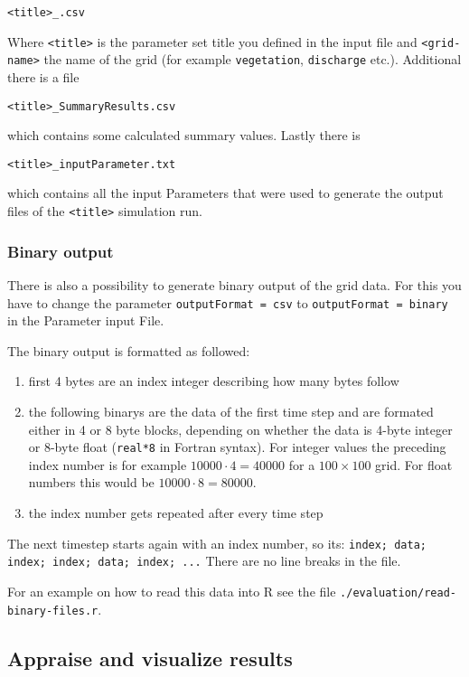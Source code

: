\texttt{<title>\_<grid-name>.csv}

Where \texttt{<title>} is the parameter set title you defined in the input file and \texttt{<grid-name>} the name of the grid (for example \texttt{vegetation}, \texttt{discharge} etc.). Additional there is a file

\texttt{<title>\_SummaryResults.csv}

which contains some calculated summary values. Lastly there is 

\texttt{<title>\_inputParameter.txt}

which contains all the input Parameters that were used to generate the output files of the \texttt{<title>} simulation run.

\subsubsection{Binary output}
There is also a possibility to generate binary output of the grid data. For this you have to change the parameter \texttt{outputFormat = csv} to \texttt{outputFormat 	= binary} in the Parameter input File.

The binary output is formatted as followed:

\begin{enumerate}

\item first 4 bytes are an index integer describing how many bytes follow
\item the following binarys are the data of the first time step and are formated either in 4 or 8 byte blocks, depending on whether the data is 4-byte integer or 8-byte float (\texttt{real*8} in Fortran syntax). For integer values the preceding index number is for example $10000\cdot4=40000$ for a $100\times100$ grid. For float numbers this would be $10000\cdot8=80000$.
\item the index number gets repeated after every time step
\end{enumerate}

The next timestep starts again with an index number, so its:
\texttt{index; data; index; index; data; index; ...} There are no line breaks in the file.

For an example on how to read this data into R see the file \texttt{./evaluation/read-binary-files.r}.


\subsection{Appraise and visualize results}


